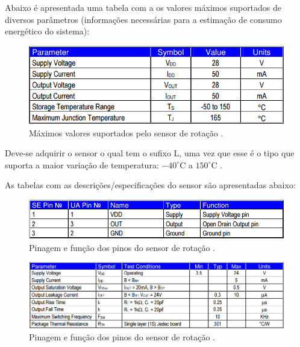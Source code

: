 	Abaixo é apresentada uma tabela com a os valores máximos suportados de diversos parâmetros 
	(informações necessárias para a estimação de consumo energético do sistema):
	
	\begin{figure}[!htbp]
	  \centering
	  \includegraphics[scale=0.5]{editaveis/figuras/sensor_rotacao_max_valores}
	  \caption[Máximos valores suportados pelo sensor de rotação.]
	  {Máximos valores suportados pelo sensor de rotação \cite{melexis}.}
	  \label{sensor_rotacao_max_valores}
	\end{figure}
	
	Deve-se adquirir o sensor o qual tem o sufixo $\mathrm{L}$, uma vez que esse é o tipo que suporta a maior variação de
	temperatura: $-40^\circ\mathrm{C}$ a $150^\circ\mathrm{C}$ \cite{melexis}.
	
	As tabelas com as descrições/especificações do sensor são apresentadas abaixo:
	
	\begin{figure}[!htbp]
	  \centering
	  \includegraphics[scale=0.5]{editaveis/figuras/sensor_rotacao_pinagem}
	  \caption[Pinagem e função dos pinos do sensor de rotação]
	  {Pinagem e função dos pinos do sensor de rotação \cite{melexis}.}
	  \label{sensor_rotacao_pinagem}
	\end{figure}
	
	\begin{figure}[!htbp]
	  \centering
	  \includegraphics[scale=0.4]{editaveis/figuras/sensor_rotacao_spec_eletrica}
	  \caption[Pinagem e função dos pinos do sensor de rotação]
	  {Pinagem e função dos pinos do sensor de rotação \cite{melexis}.}
	  \label{sensor_rotacao_spec_eletrica}
	\end{figure}
	
